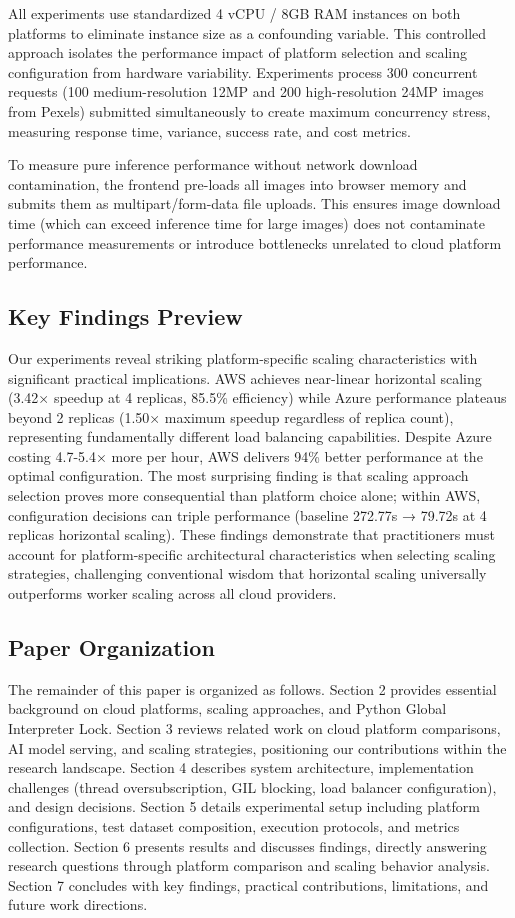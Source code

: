 All experiments use standardized 4 vCPU / 8GB RAM instances on both platforms to eliminate instance size as a confounding variable. This controlled approach isolates the performance impact of platform selection and scaling configuration from hardware variability. Experiments process 300 concurrent requests (100 medium-resolution 12MP and 200 high-resolution 24MP images from Pexels) submitted simultaneously to create maximum concurrency stress, measuring response time, variance, success rate, and cost metrics.

To measure pure inference performance without network download contamination, the frontend pre-loads all images into browser memory and submits them as multipart/form-data file uploads. This ensures image download time (which can exceed inference time for large images) does not contaminate performance measurements or introduce bottlenecks unrelated to cloud platform performance.

\subsection{Key Findings Preview}

Our experiments reveal striking platform-specific scaling characteristics with significant practical implications. AWS achieves near-linear horizontal scaling (3.42× speedup at 4 replicas, 85.5\% efficiency) while Azure performance plateaus beyond 2 replicas (1.50× maximum speedup regardless of replica count), representing fundamentally different load balancing capabilities. Despite Azure costing 4.7-5.4× more per hour, AWS delivers 94\% better performance at the optimal configuration. The most surprising finding is that scaling approach selection proves more consequential than platform choice alone; within AWS, configuration decisions can triple performance (baseline 272.77s → 79.72s at 4 replicas horizontal scaling). These findings demonstrate that practitioners must account for platform-specific architectural characteristics when selecting scaling strategies, challenging conventional wisdom that horizontal scaling universally outperforms worker scaling across all cloud providers.

\subsection{Paper Organization}

The remainder of this paper is organized as follows. Section 2 provides essential background on cloud platforms, scaling approaches, and Python Global Interpreter Lock. Section 3 reviews related work on cloud platform comparisons, AI model serving, and scaling strategies, positioning our contributions within the research landscape. Section 4 describes system architecture, implementation challenges (thread oversubscription, GIL blocking, load balancer configuration), and design decisions. Section 5 details experimental setup including platform configurations, test dataset composition, execution protocols, and metrics collection. Section 6 presents results and discusses findings, directly answering research questions through platform comparison and scaling behavior analysis. Section 7 concludes with key findings, practical contributions, limitations, and future work directions.
